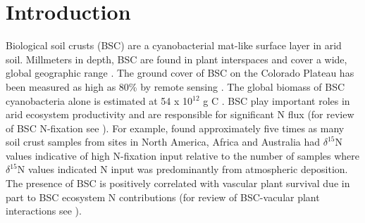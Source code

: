 \section{Introduction}


Biological soil crusts (BSC) are a cyanobacterial mat-like surface layer in arid soil. Millmeters in depth, BSC are found in plant interspaces and cover a wide, global geographic range \cite{garcia2003estimates}. The ground cover of BSC on the Colorado Plateau has been measured as high as 80\% by remote sensing \cite{karnieli2001}. The global biomass of BSC cyanobacteria alone is estimated at 54 x 10$^{12}$ g C \cite{garcia2003estimates}. BSC play important roles in arid ecosystem productivity and are responsible for significant N flux (for review of BSC N-fixation see \citet{belnap2003}). For example, \citet{Evans_1999} found approximately five times as many soil crust samples from sites in North America, Africa and Australia had $\delta^{15}$N values indicative of high N-fixation input relative to the number of samples where $\delta^{15}$N values indicated N input was predominantly from atmospheric deposition. The presence of BSC is positively correlated with vascular plant survival due in part to BSC ecosystem N contributions (for review of BSC-vacular plant interactions see \citet{BelnapVascular}).


